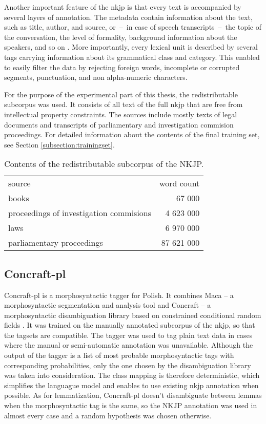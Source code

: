 Another important feature of the \gls{nkjp} is that every text is accompanied by several layers of annotation. The metadata contain information about the text, such as title, author, and source, or~--~in case of speech transcripts~--~the topic of the conversation, the level of formality, background information about the speakers, and so on \cite{przepiorkowski2009xml}. More importantly, every lexical unit is described by several tags carrying information about its grammatical class and category. This enabled to easily filter the data by rejecting foreign words, incomplete or corrupted segments, punctuation, and non alpha-numeric characters. 

For the purpose of the experimental part of this thesis, the redistributable subcorpus was used. It consists of all text of the full \gls{nkjp} that are free from intellectual property constraints. The sources include mostly texts of legal documents and transcripts of parliamentary and investigation commision proceedings. For detailed information about the contents of the final training set, see Section \ref{subsection:trainingset}.

\begin{table}[h!]
  \begin{center}
	  \caption{Contents of the redistributable subcorpus of the NKJP.}
	    \label{table:freenkjp}
	    \begin{tabular*}{.6\linewidth}{@{\extracolsep{\fill}}lr}
      source & word count \\
      \cmidrule{1-2}
      books & 67 000\\
      proceedings of investigation commisions & 4 623 000\\
      laws & 6 970 000\\
      parliamentary proceedings & 87 621 000\\
    \end{tabular*}
  \end{center}
\end{table}

\subsection{Concraft-pl}
Concraft-pl is a morphosyntactic tagger for Polish. It combines Maca -- a morphosyntactic segmentation and analysis tool and Concraft -- a morphosyntactic disambiguation library based on constrained conditional random fields \cite{waszczuk2012harnessing}. It was trained on the manually annotated subcorpus of the \gls{nkjp}, so that the tagsets are compatible. The tagger was used to tag plain text data in cases where the manual or semi-automatic annotation was unavailable. Although the output of the tagger is a list of most probable morphosyntactic tags with corresponding probabilities, only the one chosen by the disambiguation library was taken into consideration. The class mapping is therefore deterministic, which simplifies the languague model and enables to use existing \gls{nkjp} annotation when possible. As for lemmatization, Concraft-pl doesn't disambiguate between lemmas when the morphosyntactic tag is the same, so the NKJP annotation was used in almost every case and a random hypothesis was chosen otherwise.

